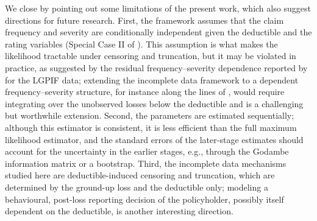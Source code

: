 \documentclass[11pt]{article}
\newcommand{\rev}[1]{{\color{blue}#1}}
\begin{document}
{\rev{We close by pointing out some limitations of the present work, which also suggest directions for future research. First, the framework assumes that the claim frequency and severity are conditionally independent given the deductible and the rating variables (Special Case II of \citet{shi2022copula}). This assumption is what makes the likelihood tractable under censoring and truncation, but it may be violated in practice, as suggested by the residual frequency--severity dependence reported by \citet{shi2022copula} for the LGPIF data; extending the incomplete data framework to a dependent frequency--severity structure, for instance along the lines of \citet{garrido2016glm}, would require integrating over the unobserved losses below the deductible and is a challenging but worthwhile extension. Second, the parameters are estimated sequentially; although this estimator is consistent, it is less efficient than the full maximum likelihood estimator, and the standard errors of the later-stage estimates should account for the uncertainty in the earlier stages, e.g., through the Godambe information matrix or a bootstrap. Third, the incomplete data mechanisms studied here are deductible-induced censoring and truncation, which are determined by the ground-up loss and the deductible only; modeling a behavioural, post-loss reporting decision of the policyholder, possibly itself dependent on the deductible, is another interesting direction.}


\newpage



%
%
%

}
\end{document}
